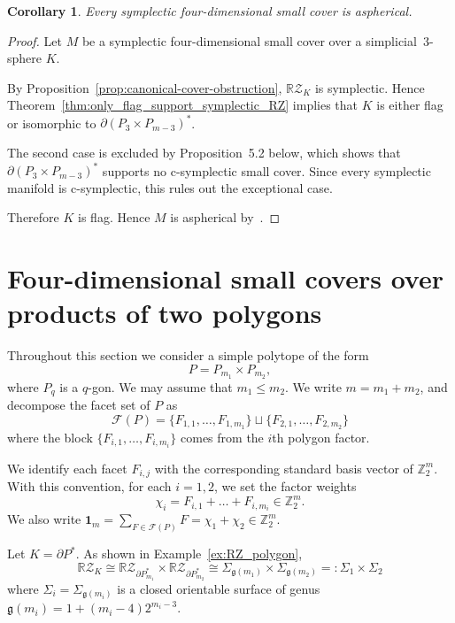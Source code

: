 \documentclass{amsart}
\newtheorem{corollary}[theorem]{Corollary}
\numberwithin{equation}{section}
\theoremstyle{definition}
\theoremstyle{remark}
\newcommand{\Z}{\mathbb Z}
\newcommand{\cF}{\mathcal F}
\newcommand{\RZ}{\mathbb R\mathcal Z}
\newcommand{\one}{\mathbf 1}
\def\genus{\mathfrak g}
\begin{document}
\begin{corollary}\label{cor:only_flag_support_symplectic_small}
    Every symplectic four-dimensional small cover is aspherical.
\end{corollary}
\begin{proof}
    Let $M$ be a symplectic four-dimensional small cover over a simplicial~$3$-sphere $K$.

    By Proposition~\ref{prop:canonical-cover-obstruction}, $\RZ_K$ is symplectic.
    Hence Theorem~\ref{thm:only_flag_support_symplectic_RZ} implies that $K$ is either flag or isomorphic to $\partial(P_3\times P_{m-3})^\ast$.

    The second case is excluded by Proposition~5.2 below, which shows that $\partial(P_3\times P_{m-3})^\ast$ supports no c-symplectic small cover.
    Since every symplectic manifold is c-symplectic, this rules out the exceptional case.

    Therefore $K$ is flag.
    Hence $M$ is aspherical by~\cite{Davis2012}.
\end{proof}




\section{Four-dimensional small covers over products of two polygons} \label{sec-four-dimensional-products}

Throughout this section we consider a simple polytope of the form 
$$
    P=P_{m_1} \times P_{m_2},
$$
where $P_{q}$ is a $q$-gon.
We may assume that $m_1 \leq m_2$.
We write $m=m_1 + m_2$, and decompose the facet set of $P$ as
$$
    \cF(P)=\{F_{1,1},\dots,F_{1,m_1}\} \sqcup \{F_{2,1},\dots,F_{2,m_2}\}
$$
where the block $\{F_{i,1},\dots,F_{i,m_i}\}$ comes from the $i$th polygon factor.

We identify each facet $F_{i,j}$ with the corresponding standard basis vector of $\Z_2^m$.
With this convention, for each $i=1,2$, we set the factor weights
$$
    \chi_i = F_{i,1}+ \dots + F_{i,m_i} \in \Z_2^m.
$$
We also write $\one_m= \sum_{F \in \cF(P)} F = \chi_1 + \chi_2  \in \Z_2^m$.

Let $K=\partial P^\ast$. 
As shown in Example~\ref{ex:RZ_polygon}, 
\begin{equation} \label{eq:RZK_productpolygon}
    \RZ_K \cong \RZ_{\partial P_{m_1}^\ast} \times \RZ_{\partial P_{m_2}^\ast} \cong \Sigma_{\genus(m_1)} \times \Sigma_{\genus(m_2)} =: \Sigma_1 \times \Sigma_2
\end{equation}
where $\Sigma_i=\Sigma_{\genus(m_i)}$ is a closed orientable surface of genus $\genus(m_i)=1+(m_i-4)2^{m_i-3}$.
\end{document}

